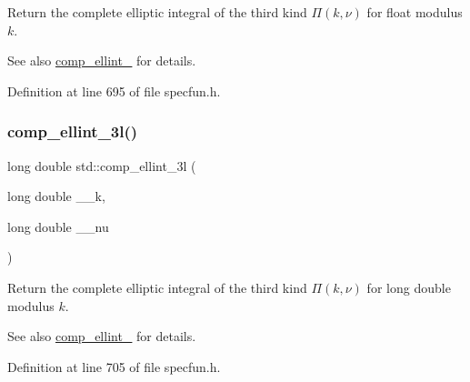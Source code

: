 Return the complete elliptic integral of the third kind $ \Pi(k,\nu) $ for {\ttfamily float} modulus $ k $. 

\begin{DoxySeeAlso}{See also}
\hyperlink{group__cxx17__math__spec__func_ga80419d323d3231870bd588525e818974}{comp\+\_\+ellint\+\_} for details. 
\end{DoxySeeAlso}


Definition at line 695 of file specfun.\+h.

\mbox{\label{group__cxx17__math__spec__func_ga1ca081fee102cd0d4d6b091285e495e5}} 
\subsubsection{\texorpdfstring{comp\+\_\+ellint\+\_\+3l()}{comp\_ellint\_3l()}}
{\footnotesize\ttfamily long double std\+::comp\+\_\+ellint\+\_\+3l (\begin{DoxyParamCaption}\item[{long double}]{\+\_\+\+\_\+k,  }\item[{long double}]{\+\_\+\+\_\+nu }\end{DoxyParamCaption})\hspace{0.3cm}{\ttfamily [inline]}}



Return the complete elliptic integral of the third kind $ \Pi(k,\nu) $ for {\ttfamily long double} modulus $ k $. 

\begin{DoxySeeAlso}{See also}
\hyperlink{group__cxx17__math__spec__func_ga80419d323d3231870bd588525e818974}{comp\+\_\+ellint\+\_} for details. 
\end{DoxySeeAlso}


Definition at line 705 of file specfun.\+h.

\mbox{\label{group__cxx17__math__spec__func_ga29504b6008798072b0b8d6ea5a50ec60}} 
